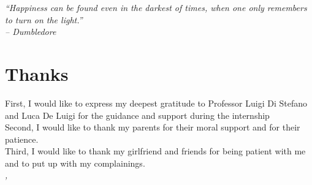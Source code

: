 
\cleardoublepage
{}
{}
\begin{flushright}{
	\slshape
	``Happiness can be found even in the darkest of times, when one only remembers to turn on the light.''
	\\ – Dumbledore} \\
	\medskip
\end{flushright}



\begingroup
\let\clearpage\relax
\let\cleardoublepage\relax
\let\cleardoublepage\relax

\chapter*{Thanks}

\noindent First, I would like to express my deepest gratitude to Professor Luigi Di Stefano and Luca De Luigi for the guidance and support during the internship\\

\noindent Second, I would like to thank my parents for their moral support and for their patience.\\


\noindent Third, I would like to thank my girlfriend and friends for being patient with me and to put up with my complainings.\\

\noindent\textit{\myLocation, \myTime}
\hfill \myName

\endgroup

